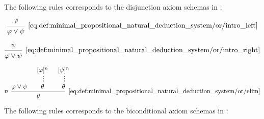 \begin{definition}
\begin{thmenum}
     The following rules corresponds to the disjunction axiom schemas in :

    \begin{minipage}{0.3\textwidth}
      \begin{equation*}\taglabel[\( \vee^{+_L} \)]{eq:def:minimal_propositional_natural_deduction_system/or/intro_left}
        \begin{prooftree}
          \hypo{ \varphi }
          \infer1[\ref{eq:def:minimal_propositional_natural_deduction_system/or/intro_left}]{ \varphi \vee \psi }
        \end{prooftree}
      \end{equation*}
    \end{minipage}
    \hfill
    \begin{minipage}{0.3\textwidth}
      \begin{equation*}\taglabel[\( \vee^{+_R} \)]{eq:def:minimal_propositional_natural_deduction_system/or/intro_right}
        \begin{prooftree}
          \hypo{ \psi }
          \infer1[\ref{eq:def:minimal_propositional_natural_deduction_system/or/intro_right}]{ \varphi \vee \psi }
        \end{prooftree}
      \end{equation*}
    \end{minipage}
    \hfill
    \begin{minipage}{0.3\textwidth}
      \begin{equation*}\taglabel[\( \vee^- \)]{eq:def:minimal_propositional_natural_deduction_system/or/elim}
        \begin{prooftree}
          \hypo{ \varphi \vee \psi }
          \hypo{ [\varphi]^n }
          \ellipsis {} { \theta }
          \hypo{ [\psi]^n }
          \ellipsis {} { \theta }
          \infer[left label=\( n \)]3[\ref{eq:def:minimal_propositional_natural_deduction_system/or/elim}]{ \theta }
        \end{prooftree}
      \end{equation*}
    \end{minipage}

     The following rules corresponds to the biconditional axiom schemas in :


\end{thmenum}
\end{definition}
